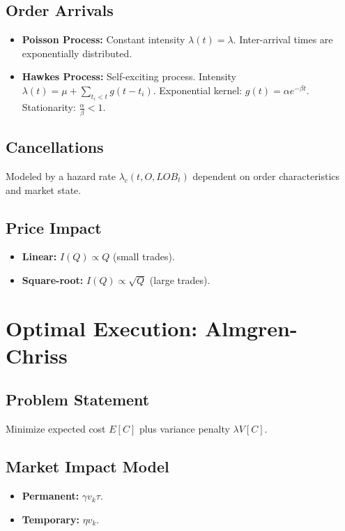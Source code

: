 \documentclass{article}
\begin{document}
\subsection{Order Arrivals}

\begin{itemize}
    \item \textbf{Poisson Process:}  Constant intensity $\lambda(t) = \lambda$. Inter-arrival times are exponentially distributed.
    \item \textbf{Hawkes Process:} Self-exciting process. Intensity $\lambda(t) = \mu + \sum_{t_i < t} g(t - t_i)$.  Exponential kernel: $g(t) = \alpha e^{-\beta t}$. Stationarity: $\frac{\alpha}{\beta} < 1$.
\end{itemize}

\subsection{Cancellations}

Modeled by a hazard rate $\lambda_c(t, O, LOB_t)$ dependent on order characteristics and market state.

\subsection{Price Impact}

\begin{itemize}
    \item \textbf{Linear:} $I(Q) \propto Q$ (small trades).
    \item \textbf{Square-root:} $I(Q) \propto \sqrt{Q}$ (large trades).
\end{itemize}


\section{Optimal Execution: Almgren-Chriss}

\subsection{Problem Statement}

Minimize expected cost $E[C]$ plus variance penalty $\lambda V[C]$.

\subsection{Market Impact Model}

\begin{itemize}
    \item \textbf{Permanent:} $\gamma v_k \tau$.
    \item \textbf{Temporary:} $\eta v_k$.
\end{itemize}
\end{document}

